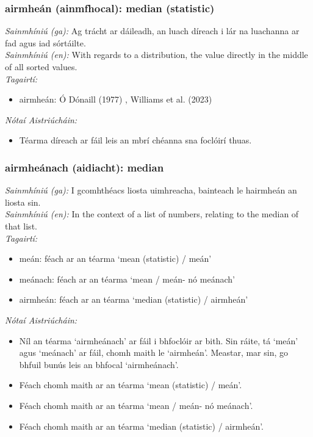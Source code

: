 \documentclass{article}
\begin{document}
\subsubsection*{airmheán (ainmfhocal): median (statistic)}
 \noindent \textit{Sainmhíniú (ga):} Ag trácht ar dáileadh, an luach díreach i lár na luachanna ar fad agus iad sórtáilte.
\\
 \noindent \textit{Sainmhíniú (en):} With regards to a distribution, the value directly in the middle of all sorted values.
\\
 \noindent \textit{Tagairtí:}
\begin{itemize}
	\item airmheán: Ó Dónaill (1977) \cite{odonaill}, Williams et al. (2023) \cite{storchiste}
\end{itemize}

 \noindent \textit{Nótaí Aistriúcháin:}
\begin{itemize}
	\item Téarma díreach ar fáil leis an mbrí chéanna sna foclóirí thuas.
\end{itemize}


\subsubsection*{airmheánach (aidiacht): median}
 \noindent \textit{Sainmhíniú (ga):} I gcomhthéacs liosta uimhreacha, bainteach le hairmheán an liosta sin.
\\
 \noindent \textit{Sainmhíniú (en):} In the context of a list of numbers, relating to the median of that list.
\\
 \noindent \textit{Tagairtí:}
\begin{itemize}
	\item meán: féach ar an téarma `mean (statistic) / meán'
	\item meánach: féach ar an téarma `mean / meán- nó meánach'
	\item airmheán: féach ar an téarma `median (statistic) / airmheán'
\end{itemize}

 \noindent \textit{Nótaí Aistriúcháin:}
\begin{itemize}
	\item Níl an téarma `airmheánach' ar fáil i bhfoclóir ar bith. Sin ráite, tá `meán' agus `meánach' ar fáil, chomh maith le `airmheán'. Meastar, mar sin, go bhfuil bunús leis an bhfocal `airmheánach'.
	\item Féach chomh maith ar an téarma `mean (statistic) / meán'.
	\item Féach chomh maith ar an téarma `mean / meán- nó meánach'.
	\item Féach chomh maith ar an téarma `median (statistic) / airmheán'.
\end{itemize}
\end{document}
